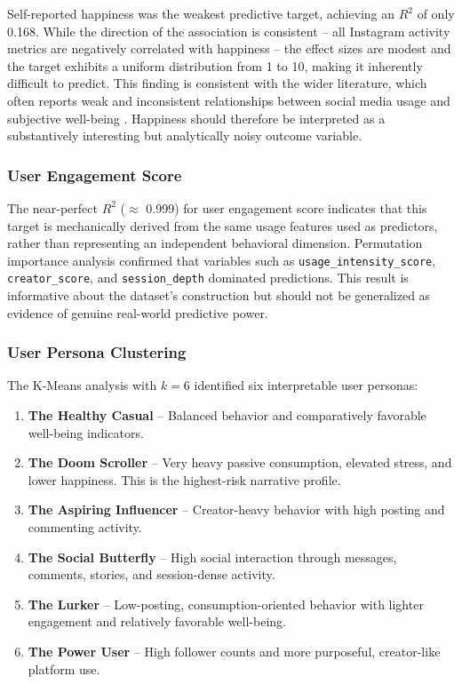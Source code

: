 \documentclass[12pt,a4paper]{article}
\begin{document}
Self-reported happiness was the weakest predictive target, achieving an $R^2$ of only 0.168. While the direction of the association is consistent -- all Instagram activity metrics are negatively correlated with happiness -- the effect sizes are modest and the target exhibits a uniform distribution from 1 to 10, making it inherently difficult to predict. This finding is consistent with the wider literature, which often reports weak and inconsistent relationships between social media usage and subjective well-being \cite{OrbenPrzybylski2019}. Happiness should therefore be interpreted as a substantively interesting but analytically noisy outcome variable.
 
\subsubsection{User Engagement Score}
 
The near-perfect $R^2$ ($\approx$ 0.999) for user engagement score indicates that this target is mechanically derived from the same usage features used as predictors, rather than representing an independent behavioral dimension. Permutation importance analysis confirmed that variables such as \texttt{usage\_intensity\_score}, \texttt{creator\_score}, and \texttt{session\_depth} dominated predictions. This result is informative about the dataset's construction but should not be generalized as evidence of genuine real-world predictive power.
 
\subsubsection{User Persona Clustering}
 
The K-Means analysis with $k = 6$ identified six interpretable user personas:
 
\begin{enumerate}
    \item \textbf{The Healthy Casual} -- Balanced behavior and comparatively favorable well-being indicators.
    \item \textbf{The Doom Scroller} -- Very heavy passive consumption, elevated stress, and lower happiness. This is the highest-risk narrative profile.
    \item \textbf{The Aspiring Influencer} -- Creator-heavy behavior with high posting and commenting activity.
    \item \textbf{The Social Butterfly} -- High social interaction through messages, comments, stories, and session-dense activity.
    \item \textbf{The Lurker} -- Low-posting, consumption-oriented behavior with lighter engagement and relatively favorable well-being.
    \item \textbf{The Power User} -- High follower counts and more purposeful, creator-like platform use.
\end{enumerate}
 
\end{document}

